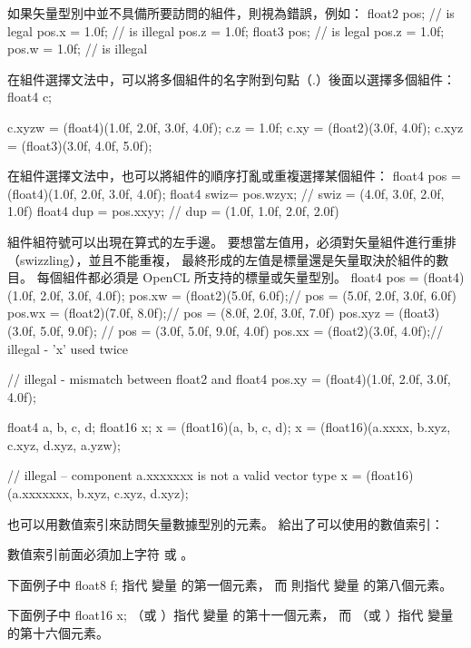 如果矢量型別中並不具備所要訪問的組件，則視為錯誤，例如：
\startclc
float2 pos;	// is legal
pos.x = 1.0f;	// is illegal
pos.z = 1.0f;
float3 pos;	// is legal
pos.z = 1.0f;
pos.w = 1.0f;	// is illegal
\stopclc

在組件選擇文法中，可以將多個組件的名字附到句點（.）後面以選擇多個組件：
\startclc
float4 c;

c.xyzw = (float4)(1.0f, 2.0f, 3.0f, 4.0f);
c.z = 1.0f;
c.xy = (float2)(3.0f, 4.0f);
c.xyz = (float3)(3.0f, 4.0f, 5.0f);
\stopclc

在組件選擇文法中，也可以將組件的順序打亂或重複選擇某個組件：
\startclc
float4 pos = (float4)(1.0f, 2.0f, 3.0f, 4.0f);
float4 swiz= pos.wzyx; // swiz = (4.0f, 3.0f, 2.0f, 1.0f)
float4 dup = pos.xxyy; // dup = (1.0f, 1.0f, 2.0f, 2.0f)
\stopclc

組件組符號可以出現在算式的左手邊。
要想當左值用，必須對矢量組件進行重排（swizzling），並且不能重複，
最終形成的左值是標量還是矢量取決於組件的數目。
每個組件都必須是 OpenCL 所支持的標量或矢量型別。
\startclc
float4 pos = (float4)(1.0f, 2.0f, 3.0f, 4.0f);
pos.xw = (float2)(5.0f, 6.0f);// pos = (5.0f, 2.0f, 3.0f, 6.0f)
pos.wx = (float2)(7.0f, 8.0f);// pos = (8.0f, 2.0f, 3.0f, 7.0f)
pos.xyz = (float3)(3.0f, 5.0f, 9.0f); // pos = (3.0f, 5.0f, 9.0f, 4.0f)
pos.xx = (float2)(3.0f, 4.0f);// illegal - 'x' used twice

// illegal - mismatch between float2 and float4
pos.xy = (float4)(1.0f, 2.0f, 3.0f, 4.0f);

float4 a, b, c, d;
float16 x;
x = (float16)(a, b, c, d);
x = (float16)(a.xxxx, b.xyz, c.xyz, d.xyz, a.yzw);

// illegal – component a.xxxxxxx is not a valid vector type
x = (float16)(a.xxxxxxx, b.xyz, c.xyz, d.xyz);
\stopclc

也可以用數值索引來訪問矢量數據型別的元素。
給出了可以使用的數值索引：

{}

數值索引前面必須加上字符  或 。

下面例子中
\startclc[indentnext=no]
float8	f;
\stopclc
{} 指代  變量  的第一個元素，
而  則指代  變量  的第八個元素。

下面例子中
\startclc[indentnext=no]
float16	x;
\stopclc
{} （或 ）指代  變量  的第十一個元素，
而  （或 ）指代  變量  的第十六個元素。

